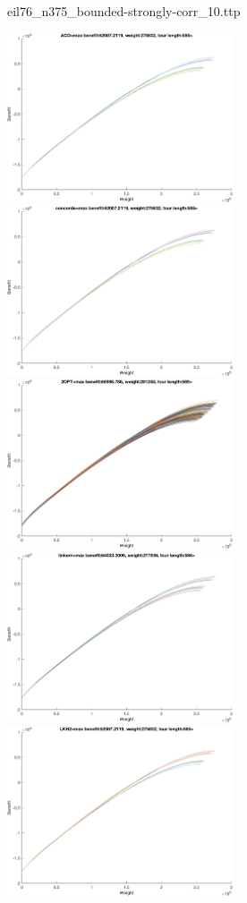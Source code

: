 \documentclass{article}
\begin{document}
\newpage
eil76\_n375\_bounded-strongly-corr\_10.ttp

\noindent
\includegraphics[width=0.5\textwidth]{eil76figs/eil76_n375_bounded-strongly-corr_10.ttp.aco.txt.eps}
\includegraphics[width=0.5\textwidth]{eil76figs/eil76_n375_bounded-strongly-corr_10.ttp.con.txt.eps}
\includegraphics[width=0.5\textwidth]{eil76figs/eil76_n375_bounded-strongly-corr_10.ttp.inv.txt.eps}
\includegraphics[width=0.5\textwidth]{eil76figs/eil76_n375_bounded-strongly-corr_10.ttp.lkh.txt.eps}
\includegraphics[width=0.5\textwidth]{eil76figs/eil76_n375_bounded-strongly-corr_10.ttp.lkh2.txt.eps}
\end{document}
